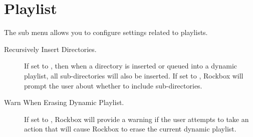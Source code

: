 \section{\label{ref:PlaylistOptions}Playlist}
The  sub menu allows you to configure settings
related to playlists.
\begin{description}
\item[Recursively Insert Directories. ]
  If set to , then when a directory is inserted or queued into a 
  dynamic playlist, all sub-directories will also be inserted. If set to ,
  Rockbox will prompt the user about whether to include sub-directories.

\item[Warn When Erasing Dynamic Playlist. ]
  If set to , Rockbox will provide a warning if the user attempts to
  take an action that will cause Rockbox to erase the current dynamic playlist.
\end{description}
